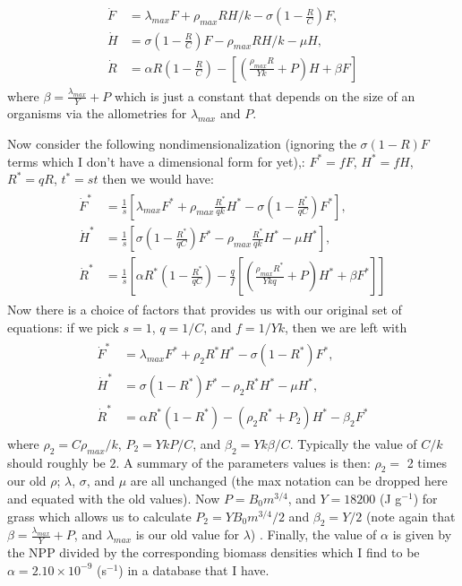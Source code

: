\documentclass{pnastwo}
\begin{document}
\begin{article}
\begin{align} 
\begin{split}
\dot{F} &= \lambda_{max} F + \rho_{max}RH/k - \sigma \left(1-\frac{R}{C}\right)F,  \\
\dot{H} &= \sigma \left(1-\frac{R}{C}\right)F - \rho_{max}R H/k - \mu H,  \\
\dot{R} &= \alpha R\left(1-\frac{R}{C}\right) -\left[\left(\frac{\rho_{max}R}{Yk}+P\right)H+\beta F\right]
\end{split}
\end{align}
where $\beta=\frac{\lambda_{max}}{Y}+P$ which is just a constant that depends on the size of an organisms via the allometries for $\lambda_{max}$ and $P$. 

Now consider the following nondimensionalization (ignoring the $\sigma (1-R)F$ terms which I don't have a dimensional form for yet),: $F^{*}=fF$, $H^{*}=fH$, $R^{*}=qR$, $t^{*}=st$ then we would have:
\begin{align} 
\begin{split}
\dot{F}^{*} &= \frac{1}{s}\left[\lambda_{max} F^{*} + \rho_{max}\frac{R^{*}}{qk}H^{*} - \sigma \left(1-\frac{R^{*}}{qC}\right)F^{*}\right],  \\
\dot{H}^{*} &= \frac{1}{s}\left[\sigma \left(1-\frac{R^{*}}{qC}\right)F^{*} - \rho_{max}\frac{R^{*}}{qk} H^{*} - \mu H^{*}\right],  \\
\dot{R}^{*} &= \frac{1}{s}\left[\alpha R^{*}\left(1-\frac{R^{*}}{qC}\right) -\frac{q}{f}\left[\left(\frac{\rho_{max}R^{*}}{Ykq}+P\right)H^{*}+\beta F^{*}\right]\right]
\end{split}
\end{align}
Now there is a choice of factors that provides us with our original set of equations: if we pick $s=1$, $q=1/C$, and $f=1/Yk$, then we are left with 
\begin{align} 
\begin{split}
\dot{F}^{*} &= \lambda_{max} F^{*} + \rho_{2}R^{*}H^{*} - \sigma \left(1-R^{*}\right)F^{*},  \\
\dot{H}^{*} &= \sigma \left(1-R^{*}\right)F^{*} - \rho_{2} R^{*}H^{*} - \mu H^{*},  \\
\dot{R}^{*} &= \alpha R^{*}\left(1-R^{*}\right) -\left(\rho_{2}R^{*}+P_{2}\right)H^{*}-\beta_{2} F^{*}
\end{split}
\end{align}
where $\rho_{2}=C\rho_{max}/k$, $P_{2}=YkP/C$, and $\beta_{2}=Yk\beta/C$. Typically the value of $C/k$ should roughly be $2$. A summary of the parameters values is then: $\rho_{2}=$ 2 times our old $\rho$; $\lambda$, $\sigma$, and $\mu$ are all unchanged (the max notation can be dropped here and equated with the old values). Now $P=B_{0}m^{3/4}$, and $Y=18200$ (J g$^{-1}$) for grass \cite{estermann} which allows us to calculate $P_{2}=YB_{0}m^{3/4}/2$ and $\beta_{2}=Y/2$ (note again that $\beta=\frac{\lambda_{max}}{Y}+P$, and $\lambda_{max}$ is our old value for $\lambda$) . Finally, the value of $\alpha$ is given by the NPP divided by the corresponding biomass densities which I find to be $\alpha=2.10\times10^{-9}$ (s$^{-1}$) in a database that I have.


\end{article}
\end{document}
